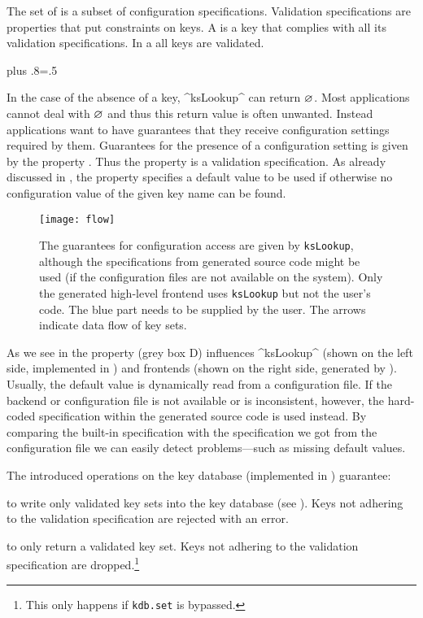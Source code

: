 The set of  is a subset of configuration specifications.
Validation specifications are properties that put constraints on keys.
A  is a key that complies with all its validation specifications.
In a  all keys are validated.%
{\parfillskip=0pt plus .8\textwidth \emergencystretch=.5\textwidth \par}

In the case of the absence of a key, ^ksLookup^ can return $\varnothing$.
Most applications cannot deal with $\varnothing$ and thus this return value is often unwanted.
Instead applications want to have guarantees that they receive configuration settings required by them.
Guarantees for the presence of a configuration setting is given by the property .
Thus the property  is a validation specification.
As already discussed in , the property  specifies a default value to be used if otherwise no configuration value of the given key name can be found.


\begin{figure}[htp]
\centering
\texttt{[image: flow]}
\caption[Guarantees for configuration access.]{The guarantees for configuration access are given by \texttt{ksLookup}, although the specifications from generated source code might be used (if the configuration files are not available on the system).
Only the generated high-level frontend uses \texttt{ksLookup} but not the user's code.
The blue part needs to be supplied by the user.
The arrows indicate data flow of key sets.}
\label{fig:flow}
\end{figure}

As we see in  the property  (grey box \colorbox{shadecolor}{{D}}) influences ^ksLookup^ (shown on the left side, implemented in ) and frontends (shown on the right side, generated by ).
Usually, the default value is dynamically read from a configuration file.
If the backend or configuration file is not available or is inconsistent, however, the hard-coded specification within the generated source code is used instead.
By comparing the built-in specification with the specification we got from the configuration file we can easily detect problems---such as missing default values.

The introduced operations on the key database (implemented in ) guarantee:
\begin{description}[font=\texttt]
\item[kdb.set:] to write only validated key sets into the key database (see ).
Keys not adhering to the validation specification are rejected with an error.
\item[kdb.get:] to only return a validated key set.
Keys not adhering to the validation specification are dropped.\footnote{This only happens if \texttt{kdb.set} is bypassed.}
\end{description}

